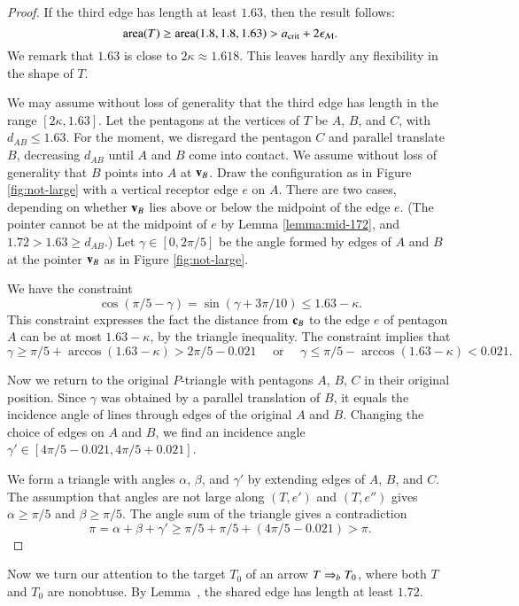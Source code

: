 \begin{proof}  
  If the third edge has length at least $1.63$, then the result
  follows:
\[
{\operatorname{area}}(T) \ge {\operatorname{area}}(1.8,1.8,1.63) > a_\text{crit} + 2\epsilon_{\mathcal M}.
\]
We remark that $1.63$ is close to $2\kappa\approx 1.618$.  This leaves
hardly any flexibility in the shape of $T$.

We may assume without loss of generality that the third edge has
length in the range $[2\kappa,1.63]$.  Let the pentagons at the
vertices of $T$ be $A$, $B$, and $C$, with $d_{AB}\le 1.63$.  For the
moment, we disregard the pentagon $C$ and parallel translate $B$,
decreasing $d_{AB}$ until $A$ and $B$ come into contact.  We assume
without loss of generality that $B$ points into $A$ at ${\mathbf v}_B$.  Draw
the configuration as in Figure \ref{fig:not-large} with a vertical
receptor edge $e$ on $A$.  There are two cases, depending on whether
${\mathbf v}_B$ lies above or below the midpoint of the edge $e$.  (The pointer
cannot be at the midpoint of $e$ by Lemma \ref{lemma:mid-172}, and
$1.72 > 1.63 \ge d_{AB}$.)  Let $\gamma\in[0,2\pi/5]$ be the angle
formed by edges of $A$ and $B$ at the pointer ${\mathbf v}_B$ as in Figure
\ref{fig:not-large}.

We have the constraint
\[
\cos(\pi/5 - \gamma) =\sin(\gamma+3\pi/10) \le 1.63 - \kappa.
\]
This constraint expresses the fact the distance from ${\mathbf c}_B$ to the
edge $e$ of pentagon $A$ can be at most $1.63-\kappa$, by the triangle
inequality.  The constraint implies that
\[
\gamma \ge \pi/5 +
\arccos (1.63-\kappa) > 2\pi/5 - 0.021\quad \text{ or }\quad
%
\gamma\le \pi/5 - \arccos(1.63-\kappa) < 0.021.
\]

Now we return to the original $P$-triangle with pentagons $A$, $B$,
$C$ in their original position.  Since $\gamma$ was obtained by a
parallel translation of $B$, it equals the incidence angle of lines
through edges of the original $A$ and $B$.  Changing the choice of
edges on $A$ and $B$, we find an incidence angle  $\gamma' \in
[4\pi/5-0.021,4\pi/5+0.021]$.

We form a triangle with angles $\alpha$, $\beta$, and $\gamma'$ by
extending edges of $A$, $B$, and $C$.  The assumption that angles are
not large along $(T,e')$ and $(T,e'')$ gives $\alpha\ge \pi/5$ and
$\beta\ge \pi/5$.  The angle sum of the triangle gives a contradiction
\[
\pi=\alpha+\beta+\gamma' 
\ge  \pi/5 + \pi/5 + (4\pi/5 - 0.021) > \pi.
\]

\end{proof}


Now we turn our attention to the target $T_0$ of an arrow $T\Rightarrow_{b} T_0$,
where both $T$ and $T_0$ are nonobtuse.  By
Lemma~, the shared edge has length at least
$1.72$.

